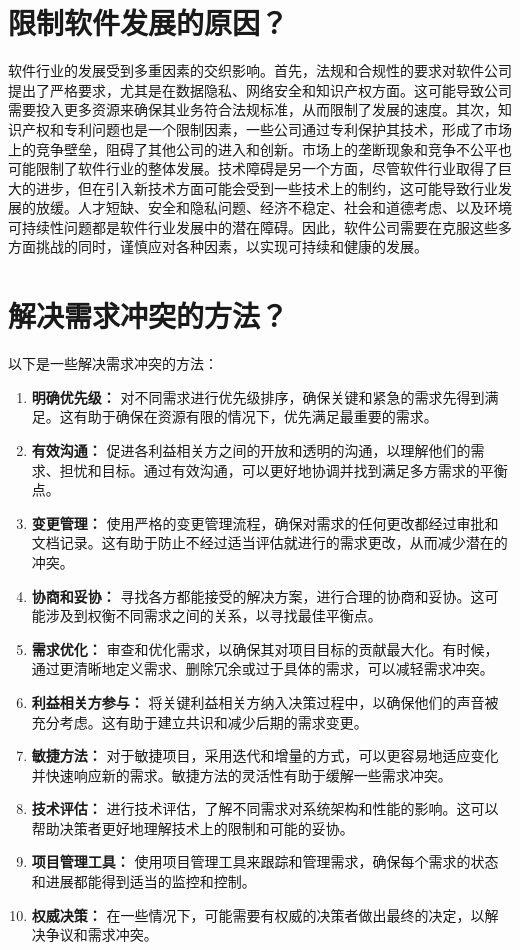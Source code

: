 \documentclass[11pt, a4paper, oneside]{ctexbook}
\begin{document}
\section{限制软件发展的原因？}
软件行业的发展受到多重因素的交织影响。首先，法规和合规性的要求对软件公司提出了严格要求，尤其是在数据隐私、网络安全和知识产权方面。这可能导致公司需要投入更多资源来确保其业务符合法规标准，从而限制了发展的速度。其次，知识产权和专利问题也是一个限制因素，一些公司通过专利保护其技术，形成了市场上的竞争壁垒，阻碍了其他公司的进入和创新。市场上的垄断现象和竞争不公平也可能限制了软件行业的整体发展。技术障碍是另一个方面，尽管软件行业取得了巨大的进步，但在引入新技术方面可能会受到一些技术上的制约，这可能导致行业发展的放缓。人才短缺、安全和隐私问题、经济不稳定、社会和道德考虑、以及环境可持续性问题都是软件行业发展中的潜在障碍。因此，软件公司需要在克服这些多方面挑战的同时，谨慎应对各种因素，以实现可持续和健康的发展。

\section{解决需求冲突的方法？}
以下是一些解决需求冲突的方法：
\begin{enumerate}
  \item \textbf{明确优先级：} 对不同需求进行优先级排序，确保关键和紧急的需求先得到满足。这有助于确保在资源有限的情况下，优先满足最重要的需求。
  \item \textbf{有效沟通：} 促进各利益相关方之间的开放和透明的沟通，以理解他们的需求、担忧和目标。通过有效沟通，可以更好地协调并找到满足多方需求的平衡点。
  \item \textbf{变更管理：} 使用严格的变更管理流程，确保对需求的任何更改都经过审批和文档记录。这有助于防止不经过适当评估就进行的需求更改，从而减少潜在的冲突。
  \item \textbf{协商和妥协：} 寻找各方都能接受的解决方案，进行合理的协商和妥协。这可能涉及到权衡不同需求之间的关系，以寻找最佳平衡点。
  \item \textbf{需求优化：} 审查和优化需求，以确保其对项目目标的贡献最大化。有时候，通过更清晰地定义需求、删除冗余或过于具体的需求，可以减轻需求冲突。
  \item \textbf{利益相关方参与：} 将关键利益相关方纳入决策过程中，以确保他们的声音被充分考虑。这有助于建立共识和减少后期的需求变更。
  \item \textbf{敏捷方法：} 对于敏捷项目，采用迭代和增量的方式，可以更容易地适应变化并快速响应新的需求。敏捷方法的灵活性有助于缓解一些需求冲突。
  \item \textbf{技术评估：} 进行技术评估，了解不同需求对系统架构和性能的影响。这可以帮助决策者更好地理解技术上的限制和可能的妥协。
  \item \textbf{项目管理工具：} 使用项目管理工具来跟踪和管理需求，确保每个需求的状态和进展都能得到适当的监控和控制。
  \item \textbf{权威决策：} 在一些情况下，可能需要有权威的决策者做出最终的决定，以解决争议和需求冲突。
\end{enumerate}
\end{document}
